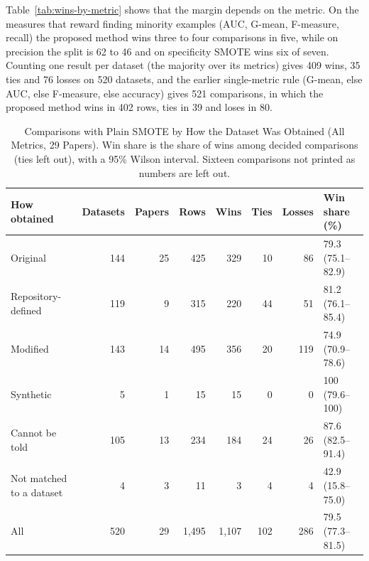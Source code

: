 Table~\ref{tab:wins-by-metric} shows that the margin depends on the metric. On the
measures that reward finding minority examples (AUC, G-mean, F-measure, recall) the
proposed method wins three to four comparisons in five, while on precision the split
is 62 to 46 and on specificity SMOTE wins six of seven. Counting one result per dataset
(the majority over its metrics) gives 409 wins, 35 ties and 76 losses on 520 datasets,
and the earlier single-metric rule (G-mean, else AUC, else F-measure, else accuracy)
gives 521 comparisons, in which the proposed method wins in 402 rows, ties in 39 and
loses in 80.

\begin{table}[t]
\centering\small
\caption{Comparisons with Plain SMOTE by How the Dataset Was Obtained (All Metrics,
29 Papers). Win share is the share of wins among decided comparisons (ties left out),
with a 95\% Wilson interval. Sixteen comparisons not printed as numbers are left out.}
\label{tab:wins-by-type}
\begin{tabular}{lrrrrrrl}
\toprule
How obtained & Datasets & Papers & Rows & Wins & Ties & Losses & Win share (\%)\\
\midrule
Original & 144 & 25 & 425 & 329 & 10 & 86 & 79.3 (75.1--82.9)\\
Repository-defined & 119 & 9 & 315 & 220 & 44 & 51 & 81.2 (76.1--85.4)\\
Modified & 143 & 14 & 495 & 356 & 20 & 119 & 74.9 (70.9--78.6)\\
Synthetic & 5 & 1 & 15 & 15 & 0 & 0 & 100 (79.6--100)\\
Cannot be told & 105 & 13 & 234 & 184 & 24 & 26 & 87.6 (82.5--91.4)\\
Not matched to a dataset & 4 & 3 & 11 & 3 & 4 & 4 & 42.9 (15.8--75.0)\\
\addlinespace
All & 520 & 29 & 1,495 & 1,107 & 102 & 286 & 79.5 (77.3--81.5)\\
\bottomrule
\end{tabular}
\end{table}

